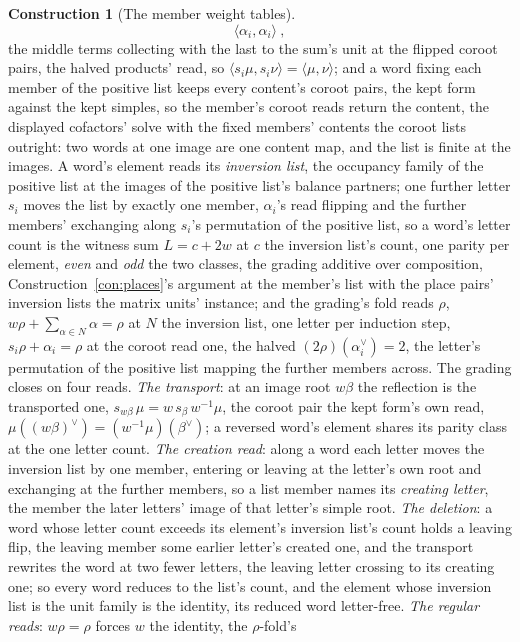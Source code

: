 \documentclass[11pt]{article}
\theoremstyle{definition}
\newtheorem{construction}{Construction}
\begin{document}
\begin{construction}[The member weight tables]
\[\langle\alpha_i,\alpha_i\rangle\ ,
\]
the middle terms collecting with the last to the sum's unit at
the flipped coroot pairs, the halved products' read, so
$\langle s_i\mu,s_i\nu\rangle=\langle\mu,\nu\rangle$; and a word
fixing each member of the positive list keeps every content's
coroot pairs, the
kept form against the kept simples, so the member's coroot reads
return the content, the displayed cofactors' solve with the fixed
members' contents the coroot lists outright: two words at one image are one content map, and the
list is finite at the images. A word's element reads
its \emph{inversion list}, the
occupancy family of the positive list at the images of the
positive list's balance partners; one further letter $s_i$ moves
the list by exactly one member, $\alpha_i$'s read flipping and
the further members' exchanging along $s_i$'s permutation of the
positive list, so a word's letter count is the witness sum
$L=c+2w$ at $c$ the inversion list's count, one parity per
element,
\emph{even} and \emph{odd} the two classes, the grading additive
over composition, Construction~\ref{con:places}'s argument at
the member's list with the place pairs' inversion lists the
matrix units' instance; and the grading's fold reads $\rho$,
$w\rho+\sum_{\alpha\in N}\alpha=\rho$ at $N$ the inversion list,
one letter per induction step, $s_i\rho+\alpha_i=\rho$ at the
coroot read one, the halved $(2\rho)(\alpha_i^\vee)=2$, the
letter's permutation of the positive list mapping the further
members across. The grading closes on four reads. \emph{The
transport}: at an image root $w\beta$ the reflection is the
transported one, $s_{w\beta}\,\mu=w\,s_\beta\,w^{-1}\mu$, the coroot
pair the kept form's own read,
$\mu((w\beta)^\vee)=(w^{-1}\mu)(\beta^\vee)$; a reversed word's
element shares its parity class at the one letter count.
\emph{The creation read}: along a word each
letter moves the inversion list by one member, entering or
leaving at the letter's own root and exchanging at the further
members, so a list member names its \emph{creating letter}, the
member the later letters' image of that letter's simple root.
\emph{The deletion}: a word whose letter count exceeds its
element's inversion list's count holds a leaving flip, the
leaving member some earlier letter's created one, and the
transport rewrites the word at two fewer letters, the leaving
letter crossing to its creating one; so every word reduces to
the list's count, and the element whose inversion list is the
unit family is the identity, its reduced word letter-free. \emph{The regular
reads}: $w\rho=\rho$ forces $w$ the identity, the $\rho$-fold's

\end{construction}
\end{document}
